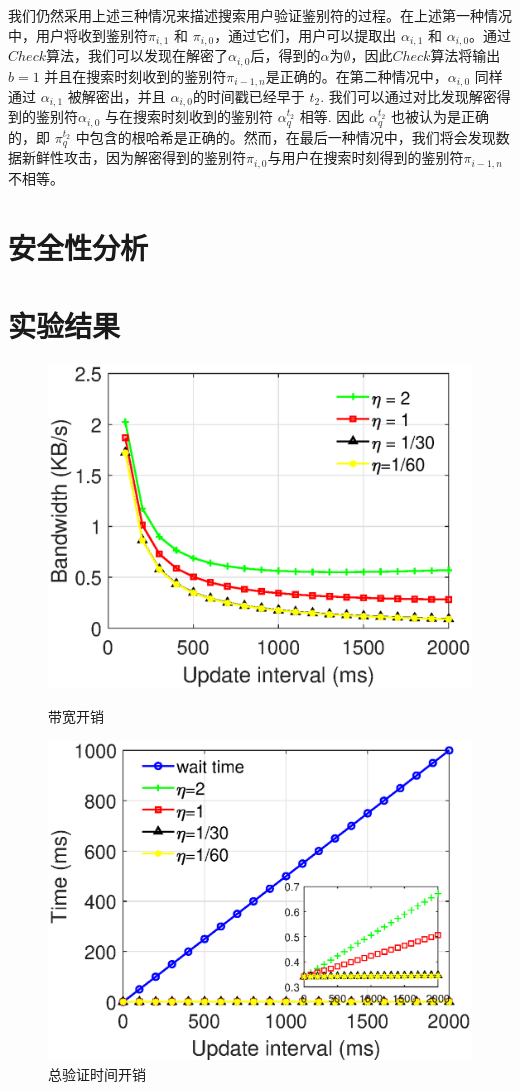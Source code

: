 我们仍然采用上述三种情况来描述搜索用户验证鉴别符的过程。在上述第一种情况中，用户将收到鉴别符$\pi_{i, 1}$ 和 $\pi_{i, 0}$，通过它们，用户可以提取出 $\alpha_{i,1}$ 和 $\alpha_{i,0}$。通过$Check$算法，我们可以发现在解密了$\alpha_{i, 0}$后，得到的$\alpha$为$\emptyset$，因此$Check$算法将输出$b=1$ 并且在搜索时刻收到的鉴别符$\pi_{i-1, n}$是正确的。在第二种情况中，$\alpha_{i, 0}$ 同样通过 $\alpha_{i, 1}$ 被解密出，并且 $\alpha_{i, 0}$的时间戳已经早于 $t_2$. 我们可以通过对比发现解密得到的鉴别符$\alpha_{i, 0}$ 与在搜索时刻收到的鉴别符 $\alpha^{t_2}_q$ 相等. 因此 $\alpha^{t_2}_q$ 也被认为是正确的，即 $\pi^{t_2}_q$ 中包含的根哈希是正确的。然而，在最后一种情况中，我们将会发现数据新鲜性攻击，因为解密得到的鉴别符$\pi_{i, 0}$与用户在搜索时刻得到的鉴别符$\pi_{i-1, n}$不相等。

\section{安全性分析}

\section{实验结果}
\label{sec:experiments}
\begin{figure}[ht]
  \begin{minipage}[b]{0.49\textwidth}
    \includegraphics[width= 3 in]{expr/bandwidth}
    \caption{带宽开销}
    \label{fig:bandwidth}
  \end{minipage}
  \begin{minipage}[b]{0.49\textwidth}
    \includegraphics[width= 3 in]{expr/verify-2}
    \caption{总验证时间开销}
    \label{fig:verify-2}
  \end{minipage}
\centering
\end{figure}

